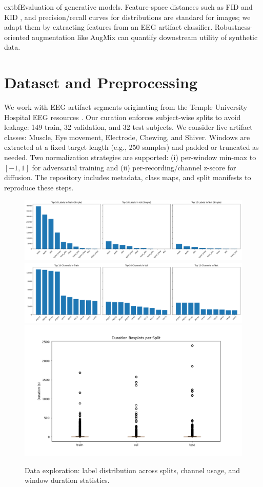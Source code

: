 \documentclass{article}
\begin{document}
	extbf{Evaluation of generative models.} Feature-space distances such as FID \citep{heusel2017gans} and KID \citep{binkowski2018demystifying}, and precision/recall curves for distributions \citep{sajjadi2018assessing} are standard for images; we adapt them by extracting features from an EEG artifact classifier. Robustness-oriented augmentation like AugMix \citep{hendrycks2020augmix} can quantify downstream utility of synthetic data.



\section{Dataset and Preprocessing}
We work with EEG artifact segments originating from the Temple University Hospital EEG resources \citep{obeid2016temple}. Our curation enforces subject-wise splits to avoid leakage: 149 train, 32 validation, and 32 test subjects. We consider five artifact classes: Muscle, Eye movement, Electrode, Chewing, and Shiver. Windows are extracted at a fixed target length (e.g., 250 samples) and padded or truncated as needed. Two normalization strategies are supported: (i) per-window min-max to $[-1,1]$ for adversarial training and (ii) per-recording/channel z-score for diffusion. The repository includes metadata, class maps, and split manifests to reproduce these steps.

\begin{figure}[t]
    \centering
    \includegraphics[width=.32\linewidth]{figs/label_dist_per_split_simple.png}\hfill
    \includegraphics[width=.32\linewidth]{figs/channel_dist_per_split_multilabel.png}\hfill
    \includegraphics[width=.32\linewidth]{figs/duration_boxplot_multilabel.png}
    \caption{Data exploration: label distribution across splits, channel usage, and window duration statistics.}
\end{figure}
\end{document}
